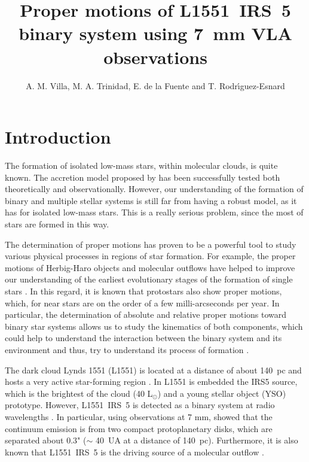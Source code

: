 \documentclass[debug]{rmaa}
\title{ Proper motions of L1551~IRS~5 binary system using 7~mm VLA observations}
\author{
  A. M. Villa\altaffilmark{1}, 
  M. A. Trinidad\altaffilmark{1,3},
  E. de la Fuente\altaffilmark{2,3}
  and T. Rodr\'{\i}guez-Esnard\altaffilmark{2}}
\begin{document}
\maketitle


\section{Introduction}
\label{sec:intro}

The formation of isolated low-mass stars, within molecular clouds, is quite known.
The accretion model proposed by \citet{Shu1987} has been successfully tested both
theoretically and observationally. However, our understanding of the formation of binary
and multiple stellar systems is still far from having a robust model, as it has for
isolated low-mass stars. This is a really serious problem, since the most of stars 
are formed in this way.

The determination of proper motions has proven to be a powerful tool to study various
physical processes in regions of star formation. For example, the proper motions of
Herbig-Haro objects and molecular outflows have helped to improve our understanding of
the earliest evolutionary stages of the formation of single stars \citep[e.g.][]{Frank2014}. 
In this regard,
it is known that protostars also show proper motions, which, for near stars
are on the order of a few milli-arcseconds per year. In particular, the determination
of absolute and relative proper motions toward binary star systems allows us to study
the kinematics of both components, which could help to understand the interaction
between the binary system and its environment and thus, try to understand its process 
of formation \citep[e.g.][]{Rodriguez2004}.

The dark cloud Lynds 1551 (L1551) is located at a distance of about 140~pc and
hosts a very active star-forming region \citep[e.g.][]{Ungerechts1987}. In L1551
is embedded the IRS5 source, which is the brightest of the cloud (40 L$_{\odot}$) and a
young stellar object (YSO) prototype. However, L1551~IRS~5 is detected as a binary
system at radio wavelengths \citep{Bieging1985}. In particular, using observations
at 7 mm, \citet{Rodriguez1998} showed that the continuum emission is from two
compact protoplanetary disks, which are separated about 0.3" ($\sim$ 40~UA at a distance
of 140~pc). Furthermore, it is also known that L1551~IRS~5 is the driving source of a
molecular outflow \citep{Snell1980}.
\end{document}
